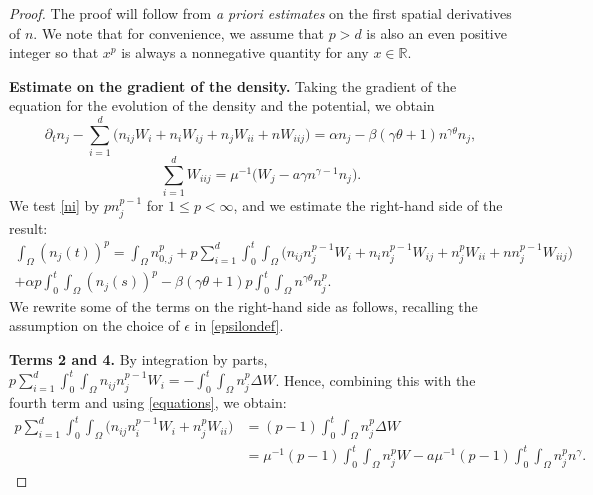 \documentclass[12pt]{article}
\def\R{{\mathbb R}}
\theoremstyle{plain}
\begin{document}
\begin{proof}
The proof will follow from \textit{a priori estimates} on the first spatial derivatives of $n$. We note that for convenience, we assume that $p > d$ is also an even positive integer so that $x^{p}$ is always a nonnegative quantity for any $x \in \R$.

\medskip

\noindent \textbf{Estimate on the gradient of the density.} Taking the gradient of the equation for the evolution of the density and the potential, we obtain
\begin{equation}\label{ni}
\partial_{t}n_{j} - \sum_{i = 1}^{d} \Big(n_{ij}W_{i} + n_{i}W_{ij} + n_{j}W_{ii} + nW_{iij}\Big) = \alpha n_{j} - \beta(\gamma \theta + 1)n^{\gamma \theta} n_{j},
\end{equation}
\begin{equation}\label{Wiij}
\sum_{i = 1}^{d} W_{iij} = \mu^{-1}\Big(W_{j} - a\gamma n^{\gamma - 1}n_{j}\Big).
\end{equation}
We test \eqref{ni} by $p n_{j}^{p - 1}$ for $1 \le p < \infty$, and we estimate the right-hand side of the result:
\begin{multline}\label{gradequality}
\int_{\Omega} (n_{j}(t))^{p} = \int_{\Omega} n_{0, j}^{p} + p\sum_{i = 1}^{d}\int_{0}^{t} \int_{\Omega} \Big(n_{ij}n_{j}^{p - 1} W_{i} + n_{i}n_{j}^{p - 1}W_{ij} + n_{j}^{p} W_{ii} + nn_{j}^{p - 1} W_{iij}\Big) \\
+ \alpha p \int_{0}^{t} \int_{\Omega} (n_{j}(s))^{p} - \beta (\gamma \theta + 1) p \int_{0}^{t} \int_{\Omega} n^{\gamma\theta} n_{j}^{p}.
\end{multline}
We rewrite some of the terms on the right-hand side as follows, recalling the assumption on the choice of $\epsilon$ in \eqref{epsilondef}.

\medskip

\noindent \textbf{Terms 2 and 4.} By integration by parts, $\displaystyle p\sum_{i = 1}^{d} \int_{0}^{t} \int_{\Omega} n_{ij}n_{j}^{p - 1} W_{i} = - \int_{0}^{t} \int_{\Omega} n_{j}^{p} \Delta W$. Hence, combining this with the fourth term and using \eqref{equations}, we obtain:
    \begin{align*}
    p\sum_{i = 1}^{d} \int_{0}^{t} \int_{\Omega} \Big(n_{ij} n_{i}^{p - 1} W_{i} + n_{j}^{p}W_{ii}\Big) &= (p - 1) \int_{0}^{t} \int_{\Omega} n_{j}^{p} \Delta W \\
    &= \mu^{-1}(p - 1) \int_{0}^{t} \int_{\Omega} n_{j}^{p} W - a\mu^{-1}(p - 1) \int_{0}^{t} \int_{\Omega} n_{j}^{p} n^{\gamma}.
    \end{align*}


\end{proof}
\end{document}
